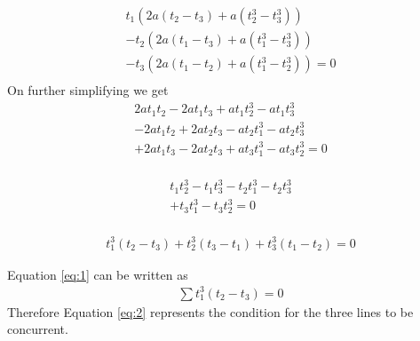 \documentclass[journal,12pt,twocolumn]{IEEEtran}
\begin{document}
\begin{equation}
\begin{split}
t_1(2a(t_2-t_3)+a(t_2^3-t_3^3))\\
-t_2(2a(t_1-t_3)+a(t_1^3-t_3^3))\\
-t_3(2a(t_1-t_2)+a(t_1^3-t_2^3))=0\\
\end{split}
\end{equation}
On further simplifying we get
\begin{equation}
\begin{split}
2at_1t_2-2at_1t_3+at_1t_2^3-at_1t_3^3\\
-2at_1t_2+2at_2t_3-at_2t_1^3-at_2t_3^3\\
+2at_1t_3-2at_2t_3+at_3t_1^3-at_3t_2^3=0\\
\end{split}
\end{equation}

\begin{equation}
\begin{split}
t_1t_2^3-t_1t_3^3-t_2t_1^3-t_2t_3^3\\
+t_3t_1^3-t_3t_2^3=0\\
\end{split}
\end{equation}

\begin{equation}
\begin{split}
t_1^3(t_2-t_3)+t_2^3(t_3-t_1)+t_3^3(t_1-t_2)=0
\end{split}
\label{eq:1}
\end{equation}

Equation \eqref{eq:1} can be written as 
\begin{equation}
\begin{split}
\sum{t_1^3(t_2-t_3)}=0
\label{eq:2}
\end{split}
\end{equation}
Therefore Equation \eqref{eq:2} represents the condition for the three lines to be concurrent.
\end{document}
